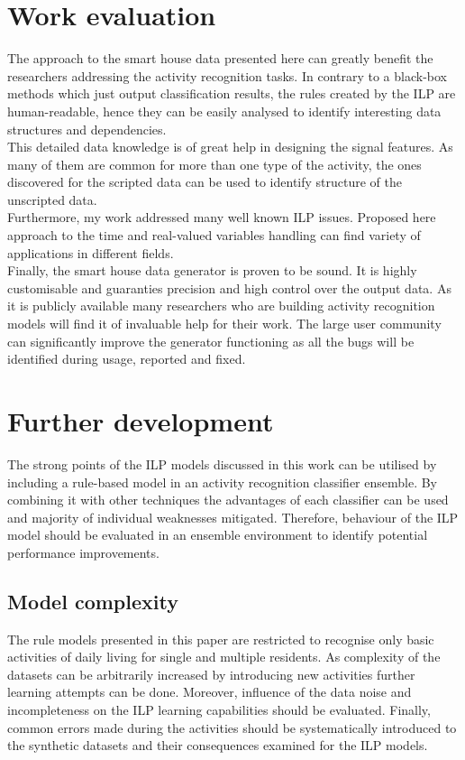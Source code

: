 \documentclass[10pt, a4paper, pdflatex, leqno, twoside, openright]{report}
\begin{document}
  \section{Work evaluation} %
The approach to the smart house data presented here can greatly benefit the researchers addressing the activity recognition tasks. In contrary to a black-box methods which just output classification results, the rules created by the ILP are human-readable, hence they can be easily analysed to identify interesting data structures and dependencies.\\
This detailed data knowledge is of great help in designing the signal features. As many of them are common for more than one type of the activity, the ones discovered for the scripted data can be used to identify structure of the unscripted data.\\

Furthermore, my work addressed many well known ILP issues. Proposed here approach to the time and real-valued variables handling can find variety of applications in different fields.\\

Finally, the smart house data generator is proven to be sound. It is highly customisable and guaranties precision and high control over the output data. As it is publicly available many researchers who are building activity recognition models will find it of invaluable help for their work. The large user community can significantly improve the generator functioning as all the bugs will be identified during usage, reported and fixed.

  \section{Further development}
The strong points of the ILP models discussed in this work can be utilised by including a rule-based model in an activity recognition classifier ensemble. By combining it with other techniques the advantages of each classifier can be used and majority of individual weaknesses mitigated. Therefore, behaviour of the ILP model should be evaluated in an ensemble environment to identify potential performance improvements.

    \subsection{Model complexity}
The rule models presented in this paper are restricted to recognise only basic activities of daily living for single and multiple residents. As complexity of the datasets can be arbitrarily increased by introducing new activities further learning attempts can be done. Moreover, influence of the data noise and incompleteness on the ILP learning capabilities should be evaluated. Finally, common errors made during the activities should be systematically introduced to the synthetic datasets and their consequences examined for the ILP models.
\end{document}
